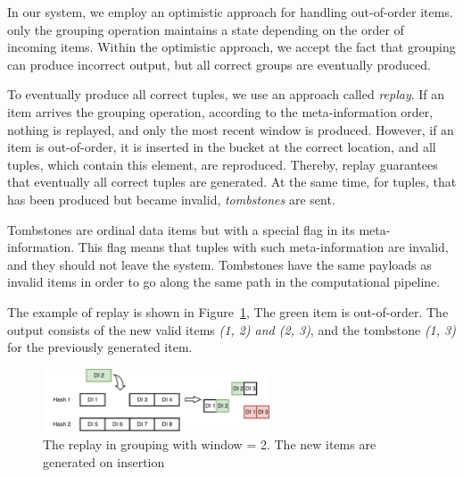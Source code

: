 In our system, we employ an optimistic approach for handling out-of-order items.
%
%
only the grouping operation maintains a state depending on the order of incoming items. 
%
Within the  optimistic approach, we accept the fact that grouping can produce incorrect output, but  all correct groups  are eventually produced. 

To eventually produce all correct tuples, we use an approach called {\it replay}. 
If an item arrives the grouping operation, according to the meta-information order, nothing is replayed, and only the most recent window is produced. 
However, if an item is out-of-order, it is inserted in the bucket at the correct location, and all tuples, which contain this element, are reproduced. 
Thereby, replay guarantees that eventually all correct tuples are generated. 
At the same time, for tuples, that has been produced but became invalid, {\it tombstones} are sent.

Tombstones are ordinal data items but with a special flag in its meta-information. 
This flag means that tuples with such meta-information are invalid, and they should not leave the system. 
Tombstones have the same payloads as invalid items in order to go along the same path in the computational pipeline.

The example of replay is shown in Figure~\ref{grouping-replaying}, The green item is out-of-order. The output consists of the new valid items {\it (1, 2) and (2, 3)}, and the tombstone {\it (1, 3)} for the previously generated item.

\begin{figure}[ht]
  \centering
  \includegraphics[width=0.6\textwidth]{pics/grouping-replaying}
  \caption{The replay in grouping with window = 2. The new items are generated on insertion}
  \label {grouping-replaying}
\end{figure}

